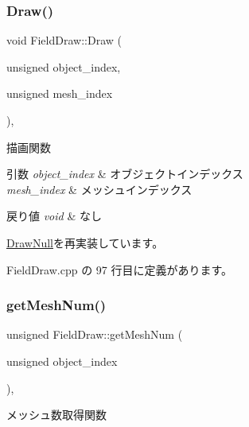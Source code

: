 \subsubsection{\texorpdfstring{Draw()}{Draw()}}
{\footnotesize\ttfamily void Field\+Draw\+::\+Draw (\begin{DoxyParamCaption}\item[{unsigned}]{object\+\_\+index,  }\item[{unsigned}]{mesh\+\_\+index }\end{DoxyParamCaption})\hspace{0.3cm}{\ttfamily [override]}, {\ttfamily [virtual]}}



描画関数 


\begin{DoxyParams}{引数}
{\em object\+\_\+index} & オブジェクトインデックス \\
\hline
{\em mesh\+\_\+index} & メッシュインデックス \\
\hline
\end{DoxyParams}

\begin{DoxyRetVals}{戻り値}
{\em void} & なし \\
\hline
\end{DoxyRetVals}


\mbox{\hyperlink{class_draw_null_a72ac0b7dc40b1469582419dcc5b0e114}{Draw\+Null}}を再実装しています。



 Field\+Draw.\+cpp の 97 行目に定義があります。

\mbox{\label{class_field_draw_a0894ddd73716f0db8ceed4b7d89f23fd}} 
\subsubsection{\texorpdfstring{get\+Mesh\+Num()}{getMeshNum()}}
{\footnotesize\ttfamily unsigned Field\+Draw\+::get\+Mesh\+Num (\begin{DoxyParamCaption}\item[{unsigned}]{object\+\_\+index }\end{DoxyParamCaption})\hspace{0.3cm}{\ttfamily [override]}, {\ttfamily [virtual]}}



メッシュ数取得関数 


